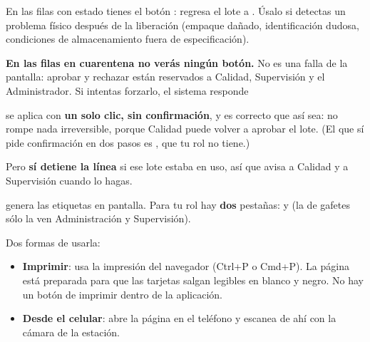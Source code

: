 
En las filas con estado \aprobado{} tienes el botón : regresa el lote a
\cuarentena. Úsalo si detectas un problema físico después de la liberación (empaque
dañado, identificación dudosa, condiciones de almacenamiento fuera de especificación).

\begin{cajaNota}
\textbf{En las filas en cuarentena no verás ningún botón.} No es una falla de la
pantalla: aprobar y rechazar están reservados a Calidad, Supervisión y el
Administrador. Si intentas forzarlo, el sistema responde
\end{cajaNota}

\vspace{6pt}

 se aplica con \textbf{un solo clic, sin confirmación}, y es correcto que
así sea: no rompe nada irreversible, porque Calidad puede volver a aprobar el lote.
(El que sí pide confirmación en dos pasos es , que tu rol no tiene.)

Pero \textbf{sí detiene la línea} si ese lote estaba en uso, así que avisa a Calidad y a
Supervisión cuando lo hagas.

\newpage
{}

 genera las etiquetas en pantalla. Para tu rol hay
\textbf{dos} pestañas:  y  (la de gafetes sólo la ven
Administración y Supervisión).


\vspace{6pt}

Dos formas de usarla:

\begin{itemize}
    \item \textbf{Imprimir}: usa la impresión del navegador (Ctrl+P o Cmd+P). La página
          está preparada para que las tarjetas salgan legibles en blanco y negro. No hay
          un botón de imprimir dentro de la aplicación.
    \item \textbf{Desde el celular}: abre la página en el teléfono y escanea de ahí con
          la cámara de la estación.
\end{itemize}

